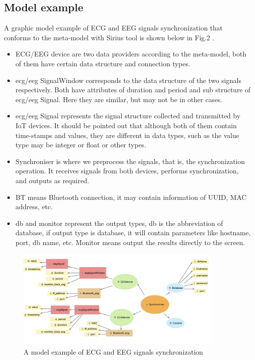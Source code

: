 \documentclass[11pt, oneside]{article}   	%
\begin{document}
\subsection{Model example}
\indent \par A graphic model example of ECG and EEG signals synchronization that conforms to the meta-model with Sirius tool\cite{ref20} is shown below in Fig.2 . 
\begin{itemize}
\item ECG/EEG device are two data providers according to the meta-model, both of them have certain data structure and connection types.
\item ecg/eeg SignalWindow corresponds to the data structure of the two signals respectively. Both have attributes of duration and period and sub structure of ecg/eeg Signal. Here they are similar, but may not be in other cases.
\item ecg/eeg Signal represents the signal structure collected and transmitted by IoT devices. It should be pointed out that although both of them contain time-stamps and values, they are different in data types, such as the value type may be integer or float or other types.
\item Synchroniser is where we preprocess the signals, that is, the synchronization operation. It receives signals from both devices, performs synchronization, and outputs as required. 
\item BT means Bluetooth connection, it may contain information of UUID, MAC address, etc. 
 \item db and monitor represent the output types, db is the abbreviation of database,  if output type is database, it will contain parameters like hostname, port, db name, etc. Monitor means output the results directly to the screen. 
\end{itemize}


\begin{figure}[htbp] 
\centering 
\includegraphics[width=0.9\textwidth]{Sirius-iDSL.png} 
\caption{A model example of ECG and EEG signals synchronization} 
\label{Fig.main2} 
\end{figure}
\end{document}
